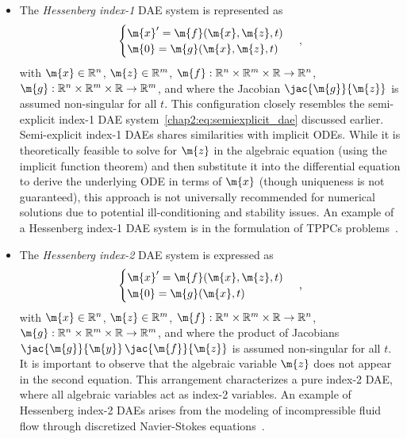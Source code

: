 \begin{itemize}
  \setlength\itemsep{0.0em}
  \item The \emph{Hessenberg index-1} \ac{DAE} system is represented as
  \begin{equation*}
    \begin{cases}
      \m{x}^{\prime} = \m{f}(\m{x}, \m{z}, t) \\
      \m{0} = \m{g}(\m{x}, \m{z}, t)
    \end{cases} \, \text{,}
  \end{equation*}
  with $\m{x} \in \mathbb{R}^n$, $\m{z} \in \mathbb{R}^m$, $\m{f}: \mathbb{R}^{n} \times \mathbb{R}^{m} \times \mathbb{R} \rightarrow \mathbb{R}^{n}$, $\m{g}: \mathbb{R}^{n} \times \mathbb{R}^{m} \times \mathbb{R} \rightarrow \mathbb{R}^{m}$, and where the Jacobian $\jac{\m{g}}{\m{z}}$ is assumed non-singular for all $t$. This configuration closely resembles the semi-explicit index-1 \ac{DAE} system~\eqref{chap2:eq:semiexplicit_dae} discussed earlier. Semi-explicit index-1 \acp{DAE} shares similarities with implicit \acp{ODE}. While it is theoretically feasible to solve for $\m{z}$ in the algebraic equation (using the implicit function theorem) and then substitute it into the differential equation to derive the underlying \ac{ODE} in terms of $\m{x}$ (though uniqueness is not guaranteed), this approach is not universally recommended for numerical solutions due to potential ill-conditioning and stability issues. An example of a Hessenberg index-1 \ac{DAE} system is in the formulation of \acp{TPPC} problems~\cite{brenan1995numerical}.
  \item The \emph{Hessenberg index-2} \ac{DAE} system is expressed as
  \begin{equation*}
    \begin{cases}
      \m{x}^{\prime} = \m{f}(\m{x}, \m{z}, t) \\
      \m{0} = \m{g}(\m{x}, t)
    \end{cases} \, \text{,}
  \end{equation*}
  with $\m{x} \in \mathbb{R}^n$, $\m{z} \in \mathbb{R}^m$, $\m{f}: \mathbb{R}^{n} \times \mathbb{R}^{m} \times \mathbb{R} \rightarrow \mathbb{R}^{n}$, $\m{g}: \mathbb{R}^{n} \times \mathbb{R}^{m} \times \mathbb{R} \rightarrow \mathbb{R}^{m}$, and where the product of Jacobians $\jac{\m{g}}{\m{y}} \, \jac{\m{f}}{\m{z}}$ is assumed non-singular for all $t$. It is important to observe that the algebraic variable $\m{z}$ does not appear in the second equation. This arrangement characterizes a pure index-2 \ac{DAE}, where all algebraic variables act as index-2 variables. An example of Hessenberg index-2 \acp{DAE} arises from the modeling of incompressible fluid flow through discretized Navier-Stokes equations~\cite{ascher1998computer}.

\end{itemize}
